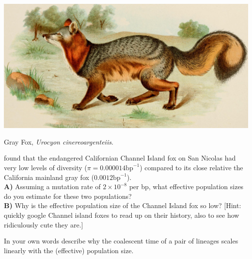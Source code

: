 \begin{marginfigure}
\begin{center}
  \includegraphics[width =
  \textwidth]{illustration_images/Quant_gen/Grey_fox/14770789583_4db7ec5164_o.jpg}  %
\end{center}
\caption{Gray Fox, {\it Urocyon cinereoargenteiis}. } 
\end{marginfigure}


\begin{question}
\citet{robinson:16} found that the endangered Californian Channel Island fox on San Nicolas had very
low levels of diversity ($\pi =0.000014 \text{bp}^{-1}$) compared to
its close relative the California mainland gray fox ($0.0012\text{bp}^{-1}$). \\
{\bf A)} Assuming a mutation rate of $2\times 10^{-8}$ per bp, what
effective population sizes do you estimate for these two populations?
\\
{\bf B)} Why is the effective population size of the Channel Island fox
so low? [Hint: quickly google Channel island foxes to read up on their
history, also to see how ridiculously cute they are.]
\end{question}


\begin{question}
In your own words describe why the coalescent time of a pair of lineages scales linearly with the (effective) population size.
\end{question}


